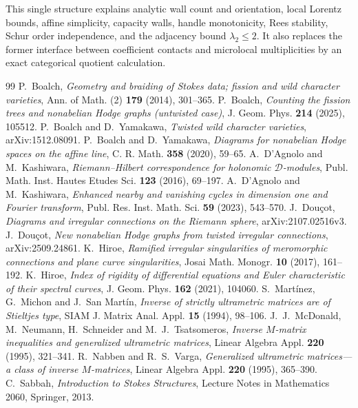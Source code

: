 \documentclass[11pt,a4paper]{amsart}
\theoremstyle{plain}
\theoremstyle{definition}
\begin{document}
This single structure explains analytic wall count and orientation, local Lorentz bounds, affine
simplicity, capacity walls, handle
monotonicity, Rees stability, Schur order independence, and the adjacency bound
$\lambda_2\leq2$.  It also replaces the former interface between coefficient contacts and
microlocal multiplicities by an exact categorical quotient calculation.

\begin{thebibliography}{99}
P.~Boalch, \emph{Geometry and braiding of Stokes data; fission and wild character varieties},
Ann. of Math. (2) \textbf{179} (2014), 301--365.
P.~Boalch, \emph{Counting the fission trees and nonabelian Hodge graphs (untwisted case)},
J. Geom. Phys. \textbf{214} (2025), 105512.
P.~Boalch and D.~Yamakawa, \emph{Twisted wild character varieties},
arXiv:1512.08091.
P.~Boalch and D.~Yamakawa, \emph{Diagrams for nonabelian Hodge spaces on the affine line},
C. R. Math. \textbf{358} (2020), 59--65.
A.~D'Agnolo and M.~Kashiwara, \emph{Riemann--Hilbert correspondence for holonomic
$\mathcal D$-modules}, Publ. Math. Inst. Hautes Etudes Sci. \textbf{123} (2016), 69--197.
A.~D'Agnolo and M.~Kashiwara, \emph{Enhanced nearby and vanishing cycles in dimension one and
Fourier transform}, Publ. Res. Inst. Math. Sci. \textbf{59} (2023), 543--570.
J.~Dou\c{c}ot, \emph{Diagrams and irregular connections on the Riemann sphere},
arXiv:2107.02516v3.
J.~Dou\c{c}ot, \emph{New nonabelian Hodge graphs from twisted irregular connections},
arXiv:2509.24861.
K.~Hiroe, \emph{Ramified irregular singularities of meromorphic connections and plane curve
singularities}, Josai Math. Monogr. \textbf{10} (2017), 161--192.
K.~Hiroe, \emph{Index of rigidity of differential equations and Euler characteristic of their
spectral curves}, J. Geom. Phys. \textbf{162} (2021), 104060.
S.~Mart\'{i}nez, G.~Michon and J.~San Mart\'{i}n, \emph{Inverse of strictly ultrametric matrices
are of Stieltjes type}, SIAM J. Matrix Anal. Appl. \textbf{15} (1994), 98--106.
J.~J.~McDonald, M.~Neumann, H.~Schneider and M.~J.~Tsatsomeros, \emph{Inverse $M$-matrix
inequalities and generalized ultrametric matrices}, Linear Algebra Appl. \textbf{220} (1995),
321--341.
R.~Nabben and R.~S.~Varga, \emph{Generalized ultrametric matrices---a class of inverse
$M$-matrices}, Linear Algebra Appl. \textbf{220} (1995), 365--390.
C.~Sabbah, \emph{Introduction to Stokes Structures}, Lecture Notes in Mathematics 2060,
Springer, 2013.
\end{thebibliography}
\end{document}
